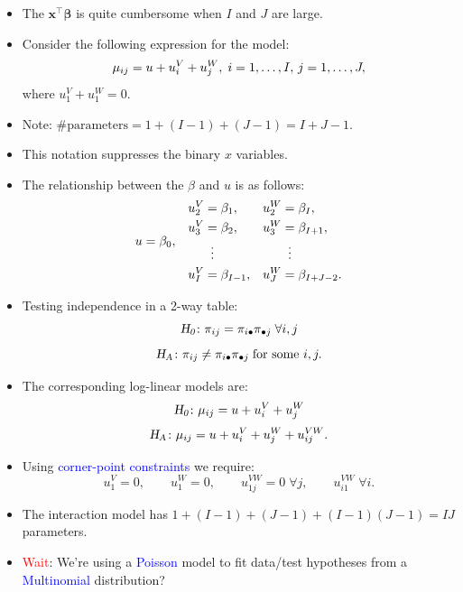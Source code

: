 \documentclass[oneside]{book}\usepackage[]{graphicx}\usepackage[svgnames]{xcolor}
\let\log\relax%
\newcommand{\HN}{\textsl{H}_{\textsl{0}}}%
\newcommand{\HA}{\textsl{H}_{\textsl{A}}}%
\providecommand{\Vector}[1]{\bm{#1}}%
\begin{document}
\begin{itemize}
    \item The $ \Vector{x}^\top \Vector{\beta} $ is quite cumbersome when $ I $ and $ J $ are large.
    \item Consider the following expression for the model:
          \[ \log{\mu_{ij}}=u+u_i^V+u_j^W,\;i=1,\ldots,I,\,j=1,\ldots,J, \]
          where $ u_1^V+u_1^W=0 $.
    \item Note: $ \text{\# parameters}=1+(I-1)+(J-1)=I+J-1 $.
    \item This notation suppresses the binary $ x $ variables.
    \item The relationship between the $ \beta $ and $ u $ is as follows:
          \[ \begin{array}{ccc}
                  u=\beta_0,                 &
                  \begin{aligned}
                      u_2^V & =\beta_1,       \\
                      u_3^V & =\beta_2,       \\
                            & \vdotswithin{=} \\
                      u_I^V & =\beta_{I-1},
                  \end{aligned} &
                  \begin{aligned}
                      u_2^W & =\beta_I,       \\
                      u_3^W & =\beta_{I+1},   \\
                            & \vdotswithin{=} \\
                      u_J^W & =\beta_{I+J-2}.
                  \end{aligned}
              \end{array} \]
    \item Testing independence in a 2-way table:
          \[ \HN\colon \pi_{ij}=\pi_{i\bullet}\pi_{\bullet j}\;\forall i,j \]
          \[ \HA\colon \pi_{ij}\ne \pi_{i\bullet}\pi_{\bullet j}\;\text{for some } i,j. \]
    \item The corresponding log-linear models are:
          \[ \HN\colon \log{\mu_{ij}}=u+u_i^V+u_j^W \]
          \[ \HA\colon\log{\mu_{ij}}=u+u_i^V+u_j^W+u_{ij}^{VW}. \]
    \item Using \textcolor{Blue}{corner-point constraints} we require:
          \[ u_1^V=0,\qquad u_1^W=0,\qquad u_{1j}^{VW}=0\;\forall j,\qquad u_{i1}^{VW}\;\forall i. \]
    \item The interaction model has $ 1+(I-1)+(J-1)+(I-1)(J-1)=IJ $ parameters.
    \item \textcolor{Red}{Wait}: We're using a \textcolor{Blue}{Poisson} model to fit data/test hypotheses from a \textcolor{Blue}{Multinomial} distribution?

\end{itemize}
\end{document}

